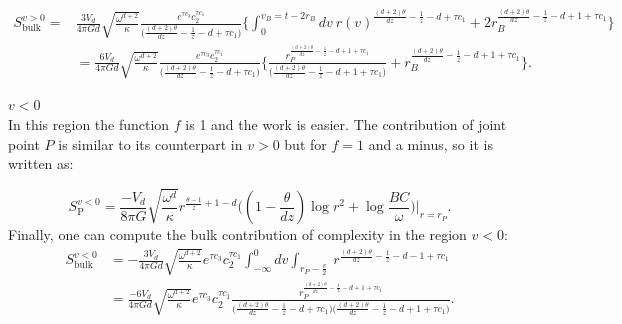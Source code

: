 \documentclass[]{article}
\begin{document}
\begin{equation}
\begin{aligned}
S^{v>0}_{\text{bulk}}=&\frac{3V_d}{4\pi Gd}\sqrt{\frac{\omega^{d+2}}{\kappa}} \frac{ e^{\tau c_3} c_2^{\tau c_1}}{\Big(\frac{(d+2)\theta}{dz}-\frac{1}{z}-d+\tau c_1\Big)}\Big\{\int_0^{v_B=t-2r_B} dv ~r(v)^{\frac{(d+2)\theta}{dz}-\frac{1}{z}-d+\tau c_1}+2 r_B^{\frac{(d+2)\theta}{dz}-\frac{1}{z}-d+1+\tau c_1}\Big\}\\
&=\frac{6V_d}{4\pi Gd}\sqrt{\frac{\omega^{d+2}}{\kappa}} \frac{ e^{\tau c_3} c_2^{\tau c_1}}{\Big(\frac{(d+2)\theta}{dz}-\frac{1}{z}-d+\tau c_1\Big)}\Big\{\frac{r_P^{\frac{(d+2)\theta}{dz}-\frac{1}{z}-d+1+\tau c_1}}{\Big(\frac{(d+2)\theta}{dz}-\frac{1}{z}-d+1+\tau c_1\Big)}+r_B^{\frac{(d+2)\theta}{dz}-\frac{1}{z}-d+1+\tau c_1}\Big\}.
\end{aligned}
\end{equation}

\textbf{\large $v<0$}
\\

In this region the function $f$ is 1 and the work is easier. The contribution of joint point $P$ is similar to its counterpart in $v>0$ but for $f=1$ and a minus, so it is written as:

\begin{equation}
S^{v<0}_{\text{P}}=\frac{-V_d}{8\pi G}\sqrt{\frac{\omega^d}{\kappa}}r^{\frac{\theta-1}{z}+1-d}\bigg((1-\frac{\theta}{dz}) \log r^2 +\log \frac{BC}{\omega}\bigg)\Big|_{r=r_P}.
\end{equation}
Finally, one can compute the bulk contribution of complexity in the region $v<0$:
\begin{equation}
\begin{aligned}
S_{\text{bulk}}^{v<0}&=-\frac{3V_d}{4\pi Gd} \sqrt{\frac{\omega^{d+2}}{\kappa}} e^{\tau c_3} c_2^{\tau c_1} \int_{-\infty}^0 dv \int_{r_P-\frac{v}{2}}~r^{\frac{(d+2)\theta}{dz}-\frac{1}{z}-d-1+\tau c_1}\\
&=\frac{-6V_d}{4\pi Gd}\sqrt{\frac{\omega^{d+2}}{\kappa}} e^{\tau c_3} c_2^{\tau c_1} \frac{r_P^{\frac{(d+2)\theta}{dz}-\frac{1}{z}-d+1+\tau c_1}}{\Big(\frac{(d+2)\theta}{dz}-\frac{1}{z}-d+\tau c_1\Big)\Big(\frac{(d+2)\theta}{dz}-\frac{1}{z}-d+1+\tau c_1\Big)}.
\end{aligned}
\end{equation}
\end{document}
